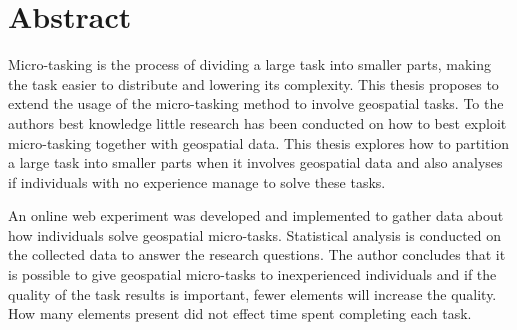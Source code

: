 \chapter*{Abstract}
%

Micro-tasking is the process of dividing a large task into smaller parts, making the task easier to distribute and lowering its complexity. This thesis proposes to extend the usage of the micro-tasking method to involve geospatial tasks. To the authors best knowledge little research has been conducted on how to best exploit micro-tasking together with geospatial data. This thesis explores how to partition a large task into smaller parts when it involves geospatial data and also analyses if individuals with no experience manage to solve these tasks.  

An online web experiment was developed and implemented to gather data about how individuals solve geospatial micro-tasks. Statistical analysis is conducted on the collected data to answer the research questions. The author concludes that it is possible to give geospatial micro-tasks to inexperienced individuals and if the quality of the task results is important, fewer elements will increase the quality. How many elements present did not effect time spent completing each task. 




